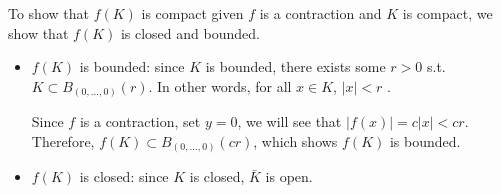 To show that $f(K)$ is compact given $f$ is a contraction and $K$ is compact, we show that $f(K)$ is closed and bounded.

\begin{itemize}
\item $f(K)$ is bounded: since $K$ is bounded, there exists some $r > 0$ s.t. $K \subset B_{(0, \ldots, 0)} (r)$. In other words, for all $x \in K$, $|x| < r$ .
    
    Since $f$ is a contraction, set $y = 0$, we will see that $|f(x)| = c|x| < cr$. Therefore, $f(K) \subset B_{(0, \ldots, 0)} (cr)$, which shows $f(K)$ is bounded.
\item $f(K)$ is closed: since $K$ is closed, $\bar{K}$ is open.
\end{itemize}